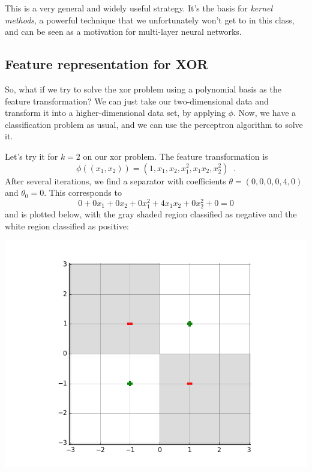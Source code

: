 This is a very general and widely useful strategy.  It's the basis for
  {\em kernel methods}, a powerful technique that we unfortunately won't
get to in this class, and can be seen as a motivation for multi-layer
neural networks.

\subsection{Feature representation for XOR}


So, what if we try to solve the {\sc xor} problem using a polynomial
basis as the feature transformation?  We can just take our
two-dimensional data and transform it into a higher-dimensional data
set, by applying $\phi$.  Now, we have a classification problem as
usual, and we can use the perceptron algorithm to solve it.

Let's try it for $k = 2$ on our {\sc xor} problem.  The feature
transformation is
\[\phi((x_1, x_2)) = (1, x_1, x_2, x_1^2, x_1 x_2, x_2^2)\;\;.\]
After several iterations, we find a separator
with coefficients $\theta = (0, 0, 0, 0, 4, 0)$ and $\theta_0 =
  0$.
This corresponds to
\[0 + 0 x_1 + 0 x_2 + 0 x_1^2 + 4 x_1 x_2 + 0x_2^2 + 0 = 0\]
and is plotted below, with the gray shaded region classified as
negative and the white region classified as positive:
\begin{examplebox}
  \begin{center}
    \includegraphics[scale=0.3]{figures/feature_representation_1.png}
  \end{center}
\end{examplebox}

